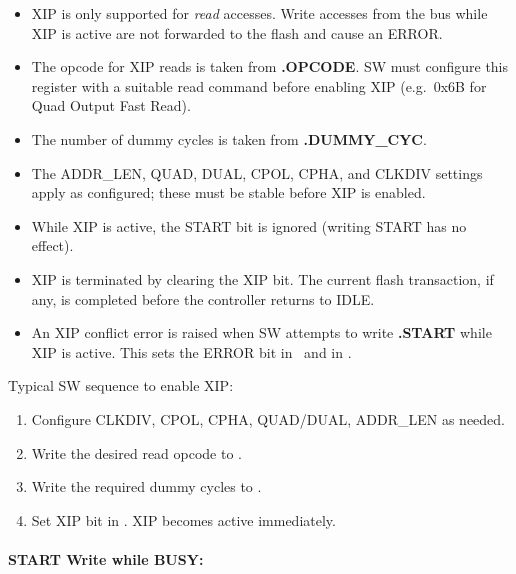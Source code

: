 \begin{itemize}
  \item XIP is only supported for \emph{read} accesses. Write accesses from the
    bus while XIP is active are not forwarded to the flash and cause an ERROR.
  \item The opcode for XIP reads is taken from \asqspiCmdRegExt\textbf{.OPCODE}.
    SW must configure this register with a suitable read command before
    enabling XIP (e.g.\ 0x6B for Quad Output Fast Read).
  \item The number of dummy cycles is taken from \asqspiDummyRegExt\textbf{.DUMMY\_CYC}.
  \item The ADDR\_LEN, QUAD, DUAL, CPOL, CPHA, and CLKDIV settings apply as
    configured; these must be stable before XIP is enabled.
  \item While XIP is active, the START bit is ignored (writing START has no effect).
  \item XIP is terminated by clearing the XIP bit. The current flash transaction,
    if any, is completed before the controller returns to IDLE.
  \item An XIP conflict error is raised when SW attempts to write
    \asqspiCtrlRegExt\textbf{.START} while XIP is active. This sets the
    ERROR bit in \asqspiStatusRegExt\ and in \asqspiRISRegExt.
\end{itemize}

Typical SW sequence to enable XIP:
\begin{enumerate}
  \item Configure CLKDIV, CPOL, CPHA, QUAD/DUAL, ADDR\_LEN as needed.
  \item Write the desired read opcode to \asqspiCmdRegExt.
  \item Write the required dummy cycles to \asqspiDummyRegExt.
  \item Set XIP bit in \asqspiCtrlRegExt. XIP becomes active immediately.
\end{enumerate}



\paragraph{START Write while BUSY: }

